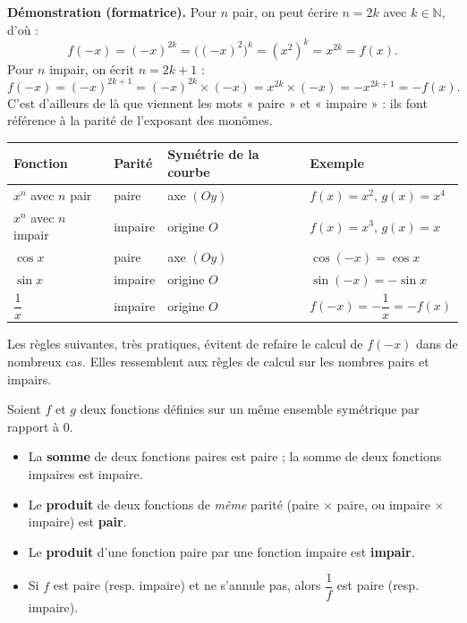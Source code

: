 \documentclass[11pt]{article}
\newcounter{popsec}
\newcounter{popsub}
\newcommand{\courssub}[1]{%
  \stepcounter{popsub}%
  \par\vspace{9pt}\noindent{\popxbold\fontsize{11.5}{13}\selectfont\color{popink}{\color{poporange}\thepopsec.\thepopsub}\hspace{6pt}#1}\par\nopagebreak\vspace{4pt}
}
\begin{document}
\textbf{Démonstration (formatrice).} Pour $n$ pair, on peut écrire $n=2k$ avec $k\in\mathbb{N}$, d'où :
\[ f(-x)=(-x)^{2k}=\bigl((-x)^2\bigr)^k=(x^2)^k=x^{2k}=f(x). \]
Pour $n$ impair, on écrit $n=2k+1$ :
\[ f(-x)=(-x)^{2k+1}=(-x)^{2k}\times(-x)=x^{2k}\times(-x)=-x^{2k+1}=-f(x). \]
C'est d'ailleurs de là que viennent les mots « paire » et « impaire » : ils font référence à la parité de l'exposant des monômes.

\begin{center}
\begin{tabularx}{\linewidth}{|l|X|X|X|}
\hline
\rowcolor{popblueL} \textbf{Fonction} & \textbf{Parité} & \textbf{Symétrie de la courbe} & \textbf{Exemple} \\
\hline
$x^n$ avec $n$ pair & paire & axe $(Oy)$ & $f(x)=x^2$, $g(x)=x^4$ \\
\hline
$x^n$ avec $n$ impair & impaire & origine $O$ & $f(x)=x^3$, $g(x)=x$ \\
\hline
$\cos x$ & paire & axe $(Oy)$ & $\cos(-x)=\cos x$ \\
\hline
$\sin x$ & impaire & origine $O$ & $\sin(-x)=-\sin x$ \\
\hline
$\dfrac{1}{x}$ & impaire & origine $O$ & $f(-x)=-\dfrac{1}{x}=-f(x)$ \\
\hline
\end{tabularx}
\end{center}

\courssub{Opérations et parité}

Les règles suivantes, très pratiques, évitent de refaire le calcul de $f(-x)$ dans de nombreux cas. Elles ressemblent aux règles de calcul sur les nombres pairs et impairs.

\begin{propriete}
Soient $f$ et $g$ deux fonctions définies sur un même ensemble symétrique par rapport à $0$.
\begin{itemize}
\item La \textbf{somme} de deux fonctions paires est paire ; la somme de deux fonctions impaires est impaire.
\item Le \textbf{produit} de deux fonctions de \emph{même} parité (paire $\times$ paire, ou impaire $\times$ impaire) est \textbf{pair}.
\item Le \textbf{produit} d'une fonction paire par une fonction impaire est \textbf{impair}.
\item Si $f$ est paire (resp. impaire) et ne s'annule pas, alors $\dfrac{1}{f}$ est paire (resp. impaire).
\end{itemize}
\end{propriete}
\end{document}
